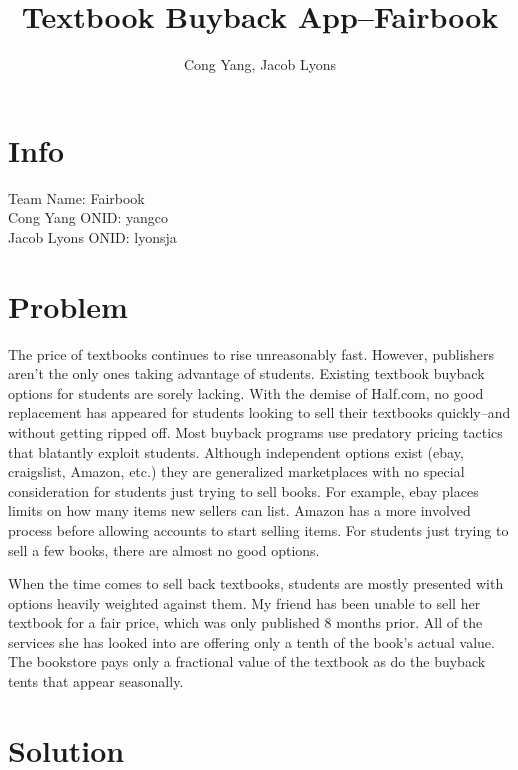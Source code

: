 \documentclass[12pt]{article}
\title{Textbook Buyback App--Fairbook}
\author{Cong Yang, Jacob Lyons}
\begin{document}
	\maketitle

	\tableofcontents
                \section{Info}
		Team Name: Fairbook \\
		Cong Yang ONID: yangco \\
		Jacob Lyons ONID: lyonsja \\


	\section{Problem}
	The price of textbooks continues to rise unreasonably fast. However, publishers aren't the only ones taking advantage of students. 
	Existing textbook buyback options for students are sorely lacking. With the demise of Half.com, 
	no good replacement has appeared for students looking to sell their textbooks quickly--and without 
	getting ripped off.	
        Most buyback programs use predatory pricing tactics that blatantly exploit students. Although independent options 
	exist (ebay, craigslist, Amazon, etc.) they are
	generalized marketplaces with no special consideration for students just trying to sell books. For example,
	ebay places limits on how many items new sellers can list. Amazon has a more involved process before allowing accounts to start selling items. For students just trying to sell a few books,
	there are almost no good options.
	
	When the time comes to sell back textbooks, students are mostly presented with options heavily weighted
	against them. My friend has been unable to sell her textbook for a fair price, which was only published 8 months prior.
	All of the services she has looked into are offering only a tenth of the book's actual value. The bookstore pays only
	a fractional value of the textbook as do the buyback tents that appear seasonally.
		

	\section{Solution}
\end{document}
